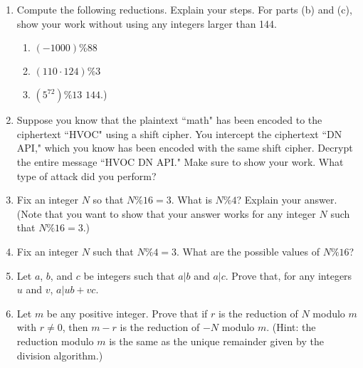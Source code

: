 \documentclass[12pt]{article}
\begin{document}
\begin{enumerate}
\item Compute the following reductions.  Explain your steps.  For parts (b) and (c), show your work without using any integers larger than 144. 
\begin{multicols}{3}
\begin{enumerate}
\item $(-1000) \% 88$
\item $(110\cdot 124) \% 3$ 
\item $\left(5^{72}\right) \% 13$ 
$144$.)
\end{enumerate}
\end{multicols}
\item Suppose you know that the plaintext ``math" has been encoded to the ciphertext ``HVOC" using a shift cipher.  You intercept the ciphertext ``DN API," which you know has been encoded with the same shift cipher.  Decrypt the entire message ``HVOC DN API." Make sure to show your work.   What type of attack did you perform?
\item Fix an integer $N$ so that $N\%16 = 3$.  What is $N\%4$?  Explain your answer. (Note that you want to show that your answer works for any integer $N$ such that $N\%16=3$.)

\item Fix an integer $N$ such that $N\%4=3$. What are the possible values of $N\%16$?

\item Let $a$, $b$, and $c$ be integers such that $a|b$ and $a|c$. Prove that,  for any integers $u$ and $v$, $a|ub+vc$. 

\item Let $m$ be any positive integer. Prove that  if $r$ is the reduction of $N$ modulo $m$ with $r\ne 0$, then $m-r$ is the reduction of $-N$ modulo $m$. (Hint: the reduction modulo $m$ is the same as the unique remainder given by the division algorithm.)

\end{enumerate}
\end{document}
